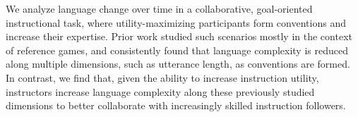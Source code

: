 We analyze language change over time in a collaborative, goal-oriented instructional task, where utility-maximizing participants form conventions and increase their expertise. Prior work studied such scenarios mostly in the context of reference games, and consistently found that language complexity is reduced along multiple dimensions, such as utterance length, as conventions are formed. In contrast, we find that, given the ability to increase instruction utility, instructors increase language complexity along these previously studied dimensions to better collaborate with increasingly skilled instruction followers.
